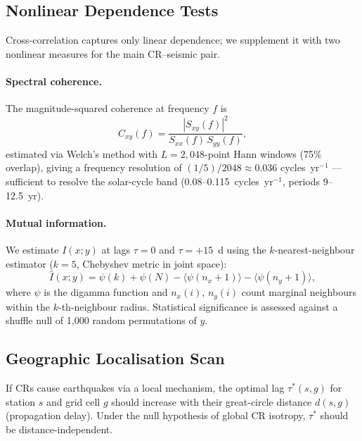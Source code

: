 \documentclass[12pt,a4paper]{article}
\begin{document}
\subsection{Nonlinear Dependence Tests}
\label{sec:methods:nonlinear}

Cross-correlation captures only linear dependence; we supplement it with two
nonlinear measures for the main CR--seismic pair.

\paragraph{Spectral coherence.}
The magnitude-squared coherence at frequency $f$ is
\begin{equation}
  C_{xy}(f) = \frac{|S_{xy}(f)|^2}{S_{xx}(f)\,S_{yy}(f)},
  \label{eq:coherence}
\end{equation}
estimated via Welch's method with $L = 2{,}048$-point Hann windows (75\%
overlap), giving a frequency resolution of $(1/5)/2048 \approx 0.036$
cycles~yr$^{-1}$ --- sufficient to resolve the solar-cycle band
(0.08--0.115~cycles~yr$^{-1}$, periods 9--12.5~yr).

\paragraph{Mutual information.}
We estimate $I(x; y)$ at lags $\tau = 0$ and $\tau = +15$~d using the
\citet{Kraskov2004} $k$-nearest-neighbour estimator ($k = 5$, Chebyshev
metric in joint space):
\begin{equation}
  \hat{I}(x; y) = \psi(k) + \psi(N)
                  - \bigl\langle\psi(n_x + 1)\bigr\rangle
                  - \bigl\langle\psi(n_y + 1)\bigr\rangle,
  \label{eq:mi}
\end{equation}
where $\psi$ is the digamma function and $n_x(i)$, $n_y(i)$ count marginal
neighbours within the $k$-th-neighbour radius.
Statistical significance is assessed against a shuffle null of 1{,}000
random permutations of $y$.

\subsection{Geographic Localisation Scan}
\label{sec:geo}

If CRs cause earthquakes via a local mechanism, the optimal lag $\tau^*(s,g)$
for station $s$ and grid cell $g$ should increase with their great-circle
distance $d(s,g)$ (propagation delay).
Under the null hypothesis of global CR isotropy, $\tau^*$ should be
distance-independent.
\end{document}
